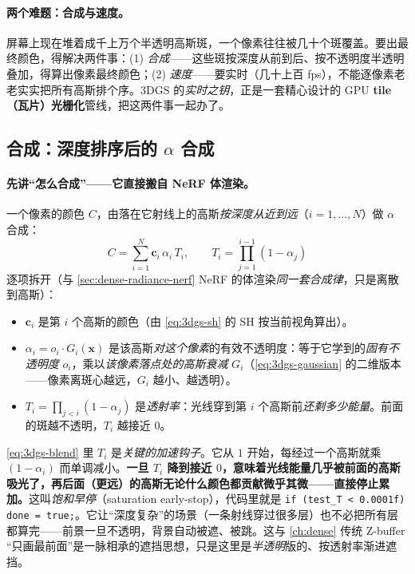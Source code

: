 \paragraph{两个难题：合成与速度。}
屏幕上现在堆着成千上万个半透明高斯斑，一个像素往往被几十个斑覆盖。要出最终颜色，得解决两件事：(1) \emph{合成}——这些斑按深度从前到后、按不透明度半透明叠加，得算出像素最终颜色；(2) \emph{速度}——要实时（几十上百 fps），不能逐像素老老实实把所有高斯排个序。3DGS 的\emph{实时之钥}，正是一套精心设计的 GPU \textbf{tile（瓦片）光栅化}管线，把这两件事一起办了。

\subsection{合成：深度排序后的 \texorpdfstring{$\alpha$}{alpha} 合成}

\paragraph{先讲“怎么合成”——它直接搬自 NeRF 体渲染。}
一个像素的颜色 $C$，由落在它射线上的高斯\emph{按深度从近到远}（$i=1,\dots,N$）做 $\alpha$ 合成：
\begin{equation}
  \boxed{\;C=\sum_{i=1}^{N}\mathbf c_i\,\alpha_i\,T_i,\qquad T_i=\prod_{j=1}^{i-1}(1-\alpha_j)\;}
  \label{eq:3dgs-blend}
\end{equation}
逐项拆开（与 \cref{sec:dense-radiance-nerf} NeRF 的体渲染\emph{同一套合成律}，只是离散到高斯）：
\begin{itemize}
  \item $\mathbf c_i$ 是第 $i$ 个高斯的颜色（由 \cref{eq:3dgs-sh} 的 SH 按当前视角算出）。
  \item $\alpha_i=o_i\cdot G_i(\mathbf x)$ 是该高斯\emph{对这个像素}的有效不透明度：等于它学到的\emph{固有不透明度} $o_i$，乘以\emph{该像素落点处的高斯衰减} $G_i$（\cref{eq:3dgs-gaussian} 的二维版本——像素离斑心越远，$G_i$ 越小、越透明）。
  \item $T_i=\prod_{j<i}(1-\alpha_j)$ 是\emph{透射率}：光线穿到第 $i$ 个高斯前\emph{还剩多少能量}。前面的斑越不透明，$T_i$ 越接近 $0$。
\end{itemize}

\begin{insight}
\cref{eq:3dgs-blend} 里 $T_i$ 是\emph{关键的加速钩子}。它从 $1$ 开始，每经过一个高斯就乘 $(1-\alpha_i)$ 而单调减小。\textbf{一旦 $T_i$ 降到接近 $0$，意味着光线能量几乎被前面的高斯吸光了，再后面（更远）的高斯无论什么颜色都贡献微乎其微——直接停止累加。}这叫\emph{饱和早停}（saturation early-stop），代码里就是 \texttt{if (test\_T < 0.0001f) done = true;}。它让“深度复杂”的场景（一条射线穿过很多层）也不必把所有层都算完——前景一旦不透明，背景自动被遮、被跳。这与 \cref{ch:dense} 传统 Z-buffer “只画最前面”是一脉相承的遮挡思想，只是这里是\emph{半透明}版的、按透射率渐进遮挡。
\end{insight}

